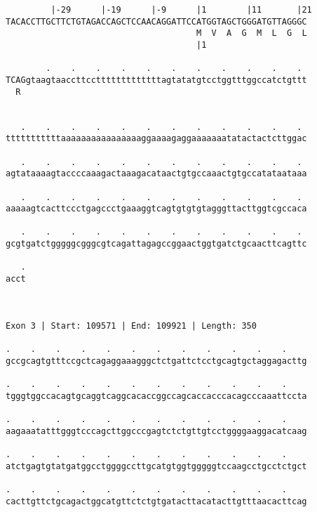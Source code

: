 \documentclass{article}
\begin{document}
\begin{Verbatim}
         |-29      |-19      |-9      |1        |11       |21
TACACCTTGCTTCTGTAGACCAGCTCCAACAGGATTCCATGGTAGCTGGGATGTTAGGGC
                                      M  V  A  G  M  L  G  L
                                      |1                    
  
        .    .    .    .    .    .    .    .    .    .    . 
TCAGgtaagtaaccttcctttttttttttttagtatatgtcctggtttggccatctgttt
  R                                                         
                                                            
  
   .    .    .    .    .    .    .    .    .    .    .    . 
tttttttttttaaaaaaaaaaaaaaaaggaaaagaggaaaaaaatatactactcttggac
                                                            
   .    .    .    .    .    .    .    .    .    .    .    . 
agtataaaagtaccccaaagactaaagacataactgtgccaaactgtgccatataataaa
                                                            
   .    .    .    .    .    .    .    .    .    .    .    . 
aaaaagtcacttccctgagccctgaaaggtcagtgtgtgtagggttacttggtcgccaca
                                                            
   .    .    .    .    .    .    .    .    .    .    .    . 
gcgtgatctgggggcgggcgtcagattagagccggaactggtgatctgcaacttcagttc
                                                            
   .
acct
    
    
 
Exon 3 | Start: 109571 | End: 109921 | Length: 350
 
.    .    .    .    .    .    .    .    .    .    .    .    
gccgcagtgtttccgctcagaggaaagggctctgattctcctgcagtgctaggagacttg
                                                            
.    .    .    .    .    .    .    .    .    .    .    .    
tgggtggccacagtgcaggtcaggcacaccggccagcaccacccacagcccaaattccta
                                                            
.    .    .    .    .    .    .    .    .    .    .    .    
aagaaatatttgggtcccagcttggcccgagtctctgttgtcctggggaaggacatcaag
                                                            
.    .    .    .    .    .    .    .    .    .    .    .    
atctgagtgtatgatggcctggggccttgcatgtggtgggggtccaagcctgcctctgct
                                                            
.    .    .    .    .    .    .    .    .    .    .    .    
cacttgttctgcagactggcatgttctctgtgatacttacatacttgtttaacacttcag
                                                            

\end{Verbatim}
\end{document}
